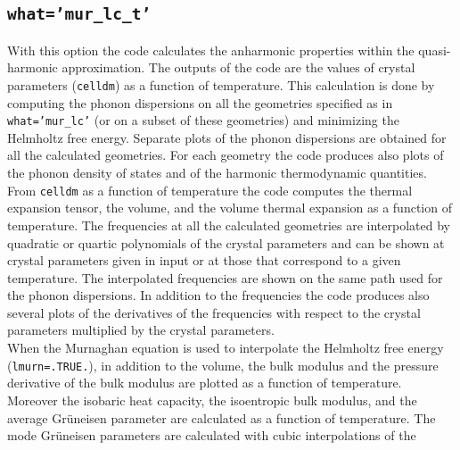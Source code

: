 \documentclass[12pt,a4paper]{article}
\begin{document}

\subsection{\color{web-blue}\texttt{what='mur\_lc\_t'}}
With this option the code calculates the anharmonic 
properties within the quasi-harmonic approximation. 
The outputs of the code are the values of crystal parameters 
(\texttt{celldm}) as a function of temperature. This calculation is done 
by computing the phonon dispersions on all the geometries specified as in
\texttt{what='mur\_lc'} (or on a subset of these geometries) and 
minimizing the Helmholtz free energy.
Separate plots of the phonon dispersions are obtained for all the 
calculated geometries.
For each geometry the code produces also plots of the phonon density
of states and of the harmonic thermodynamic quantities.
From \texttt{celldm} as a function of temperature the code computes the thermal
expansion tensor, the volume, and the volume thermal expansion as a 
function of temperature. 
The frequencies at all the calculated geometries are interpolated
by quadratic or quartic polynomials of the crystal parameters
and can be shown at crystal parameters given in input or at those that
correspond to a given temperature. The interpolated frequencies  
are shown on the same path used for the phonon dispersions.
In addition to the frequencies the code produces also several plots of
the derivatives of the frequencies with respect to the crystal parameters
multiplied by the crystal parameters. \\
When the Murnaghan equation is used to interpolate the
Helmholtz free energy (\texttt{lmurn=.TRUE.}), in addition to the volume, 
the bulk modulus and the pressure derivative of the bulk modulus are 
plotted as a function of 
temperature. Moreover the isobaric heat capacity, the isoentropic 
bulk modulus, and the average Gr\"uneisen parameter are calculated as 
a function of temperature.
The mode Gr\"uneisen parameters are calculated with cubic interpolations of the
\end{document}
